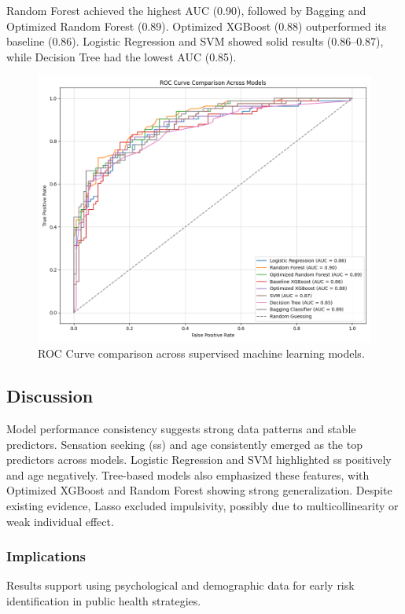 \documentclass{article}
\begin{document}
Random Forest achieved the highest AUC (0.90), followed by Bagging and Optimized Random Forest (0.89). Optimized XGBoost (0.88) outperformed its baseline (0.86). Logistic Regression and SVM showed solid results (0.86–0.87), while Decision Tree had the lowest AUC (0.85).

\begin{figure}[h!]
    \centering
    \includegraphics[width=\textwidth]{Figure_1.png}
    \caption{ROC Curve comparison across supervised machine learning models.}
    \label{fig:ROC}
\end{figure}

\subsection*{Discussion}

Model performance consistency suggests strong data patterns and stable predictors. Sensation seeking (ss) and age consistently emerged as the top predictors across models. Logistic Regression and SVM highlighted ss positively and age negatively. Tree-based models also emphasized these features, with Optimized XGBoost and Random Forest showing strong generalization. Despite existing evidence, Lasso excluded impulsivity, possibly due to multicollinearity or weak individual effect.

\subsubsection*{Implications}
Results support using psychological and demographic data for early risk identification in public health strategies.
\end{document}
